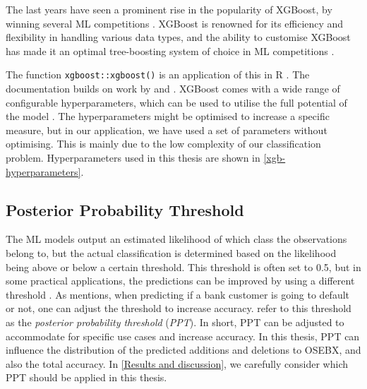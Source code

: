 The last years have seen a prominent rise in the popularity of XGBoost, by winning several ML competitions \parencite{ntnu-thesis-why-does-xgboost-win-every-machine-learning-competition}. XGBoost is renowned for its efficiency and flexibility in handling various data types, and the ability to customise XGBoost has made it an optimal tree-boosting system of choice in ML competitions \parencite{ntnu-thesis-why-does-xgboost-win-every-machine-learning-competition}. 

The function \texttt{xgboost::xgboost()} is an application of this in R \parencite{xgboost-package-yuan}. The documentation builds on work by \textcite{friedman-additive-logistic-regression} and \parencite*{friedman-greedy-function-approximation}. XGBoost comes with a wide range of configurable hyperparameters, which can be used to utilise the full potential of the model \parencite{kaggle-xgboost-hyperparameter}. The hyperparameters might be optimised to increase a specific measure, but in our application, we have used a set of parameters without optimising. This is mainly due to the low complexity of our classification problem. Hyperparameters used in this thesis are shown in \autoref{xgb-hyperparameters}.


\subsection{Posterior Probability Threshold}

The ML models output an estimated likelihood of which class the observations belong to, but the actual classification is determined based on the likelihood being above or below a certain threshold. This threshold is often set to 0.5, but in some practical applications, the predictions can be improved by using a different threshold \parencite{ban404-an-introduction-to-statistical-learning}. As \textcite{ban404-an-introduction-to-statistical-learning} mentions, when predicting if a bank customer is going to default or not, one can adjust the threshold to increase accuracy. \textcite{ban404-an-introduction-to-statistical-learning} refer to this threshold as the \textit{posterior probability threshold} (\textit{PPT}). In short, PPT can be adjusted to accommodate for specific use cases and increase accuracy. In this thesis, PPT can influence the distribution of the predicted additions and deletions to OSEBX, and also the total accuracy. In \autoref{Results and discussion}, we carefully consider which PPT should be applied in this thesis.

